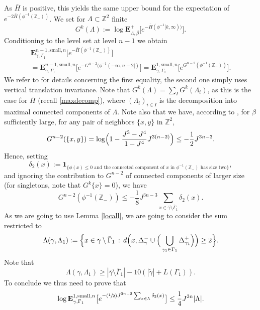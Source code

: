 \documentclass[JEP,XML,SOM,Unicode, NoFloatCountersInSection]{cedram}
\newcommand{\sep}{\,:\,}
\newcommand{\Psfrac}[2]{(\sfrac{#1}{#2})}
\numberwithin{equation}{section}
\theoremstyle{plain}
\theoremstyle{definition}
\newcommand{\sm}{\mathrm{small}}
\newcommand{\ind}{\mathbf{1}}
\newcommand{\bE}{{\ensuremath{\mathbf E}} }
\newcommand{\bbZ}{{\ensuremath{\mathbb Z}} }
\newcommand{\gb}{\beta}
\newcommand{\gG}{\Gamma}
\newcommand{\gL}{\Lambda}
\begin{document}
As $\bar H$ is positive, this yields the same upper bound for the expectation of $e^{-2\bar H(\phi^{-1}(\bbZ_-))}$.
We set for $\gL\subset\bbZ^2$ finite
\begin{equation*}
G^{k}(\gL):= \log \bE^+_{\gL,\gb} \bigl[e^{-\bar H(\phi^{-1}[k,\infty))}\bigr].
\end{equation*}
Conditioning to the level set at level $n-1$ we obtain
\begin{multline*}%
\bE^{n-1,\sm,n}_{\gamma,\gG_1}\bigl[ e^{-\bar H(\phi^{-1}(\bbZ_-))} \bigr]
\\=\bE^{n-1,\sm,n}_{\gamma,\gG_1}\bigl[ e^{-G^{n-2}(\phi^{-1}(-\infty,n-2])} \bigr]=
\bE^{1,\sm,n}_{\gamma,\gG_1}\bigl[ e^{G^{n-2}(\phi^{-1}(\bbZ_-))} \bigr].
\end{multline*}
We refer to \cite[Eq.\,(6.7)]{cf:part1} for details concerning the first equality, the second one simply uses vertical translation invariance.
Note that $G^k(\gL)=\sum_I G^k(\gL_i)$, as this is the case for $\bar H$ (recall \eqref{maxdecomp}), where $(\gL_i)_{i\in I}$ is the decomposition
into maximal connected components of $\gL$.
Note also that we have, according to \cite[Lem.\,6.2]{cf:part1}, for $\gb$ sufficiently large, for any pair of neighbors $\{x,y\}$ in $\bbZ^2$,
\begin{equation*}
G^{n-2}(\{x,y\})=\log \Bigl(1- \frac{J^3-J^4}{1-J^4}J^{3(n-2)} \Bigr)\le -\frac{1}{2}J^{3n-3}.
\end{equation*}
Hence, setting
\begin{equation*}
\delta_2(x):=\ind_{\{\phi(x)\le 0 \text{ and the connected component of $x$ in $\phi^{-1}(\bbZ_-)$ has size two}\}},
\end{equation*}
and ignoring the contribution to $G^{n-2}$ of connected components of larger size (for singletons, note that $G^{k}\{x\}=0$), we have
\begin{equation*}
G^{n-2}(\phi^{-1}(\bbZ_-))\le -\frac{1}{8}J^{3n-3} \sum_{x\in \bar \gamma \setminus \bar \gG_1}\delta_2(x).
\end{equation*}
As we are going to use Lemma \ref{locall}, we are going to consider the sum restricted to
\begin{equation*}
\gL(\gamma,\gL_1):=\Bigl\{ x\in \bar \gamma \setminus \bar \gG_1 \sep d\Bigl(x, \Delta^-_{\gamma}\cup \Big(\bigcup_{\gamma_1\in \gG_1} \Delta^+_{\gamma_1}\Big)\Bigr)\ge 2\Bigr\}.
\end{equation*}
Note that
\begin{equation*}
\gL(\gamma,\gL_1)\ge |\bar \gamma \setminus \bar \gG_1|- 10 \left(|\tilde \gamma| + L(\gG_1) \right).
\end{equation*}
To conclude we thus need to prove that
\begin{equation}\label{zoyer}
\log \bE^{1,\sm,n}_{\gamma,\gG_1}\bigl[ e^{-\Psfrac{1}{2}J^{3n-3} \sum_{x\in \gL}\delta_2(x)} \bigr]\le \frac{1}{4}J^{3n}|\gL|.
\end{equation}
\end{document}
